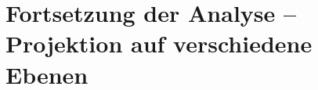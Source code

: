 
\setcounter{P-section}{6}
\renewcommand*\thesection{P\Nummerierung{\arabic{P-section}}}
\section{Fortsetzung der Analyse – Projektion auf verschiedene Ebenen}
